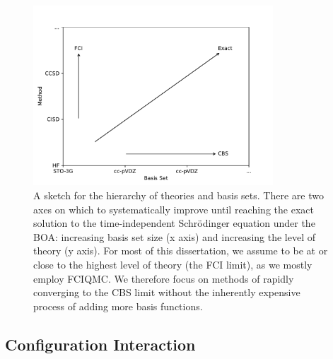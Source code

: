 \begin{figure}[htbp]
    \centering
    \includegraphics[width=0.8\textwidth]{figures/intro/hierarchies.pdf}
    \caption{A sketch for the hierarchy of theories and basis sets. There are two axes on which to systematically improve until reaching the exact solution to the time-independent Schr\"odinger equation under the \gls{BOA}: increasing basis set size (x axis) and increasing the level of theory (y axis). For most of this dissertation, we assume to be at or close to the highest level of theory (the FCI limit), as we mostly employ \gls{FCIQMC}. We therefore focus on methods of rapidly converging to the \gls{CBS} limit without the inherently expensive process of adding more basis functions.}
    \label{fig:hierarchies}
\end{figure}



\subsection{Configuration Interaction}
\label{sec:ci}

